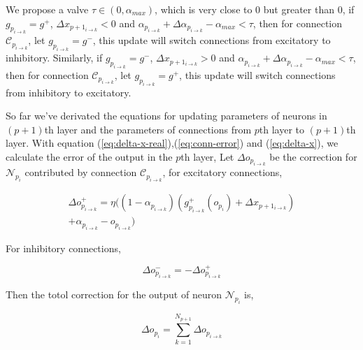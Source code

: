\documentclass[conference]{IEEEtran}
\begin{document}
We propose a valve $\tau\in(0,\alpha_{max})$, which is very close to 0 but greater
than 0, if $g_{p_{i\rightarrow{k}}}=g^{+}$, $\Delta x_{p+1_{i\rightarrow{k}}}<0$
and $\alpha_{p_{i\rightarrow{k}}}+\Delta\alpha_{p_{i\rightarrow{k}}}-\alpha_{max}<\tau$,
then for connection $\mathcal{C}_{p_{i\rightarrow{k}}}$, let $g_{p_{i\rightarrow{k}}}=g^{-}$, this update will
switch connections from excitatory to inhibitory.
Similarly, if $g_{p_{i\rightarrow{k}}}=g^{-}$, $\Delta x_{p+1_{i\rightarrow{k}}}>0$
and $\alpha_{p_{i\rightarrow{k}}}+\Delta\alpha_{p_{i\rightarrow{k}}}-\alpha_{max}<\tau$,
then for connection $\mathcal{C}_{p_{i\rightarrow{k}}}$, let $g_{p_{i\rightarrow{k}}}=g^{+}$, this update will
switch connections from inhibitory to excitatory.




So far we've derivated the equations for updating parameters of neurons
in $(p+1)$th layer and the parameters of connections from $p$th layer to
$(p+1)$th layer. With equation (\ref{eq:delta-x-real}),(\ref{eq:conn-error})
and (\ref{eq:delta-x}), we calculate the error of the output in the $p$th layer,
Let $\Delta o_{p_{i\rightarrow{k}}}$ be the correction for $\mathcal{N}_{p_i}$
contributed by connection $\mathcal{C}_{p_{i\rightarrow{k}}}$,
for excitatory connections,

\begin{multline}
    \Delta o^{+}_{p_{i\rightarrow{k}}} =
        \eta((1-\alpha_{p_{i\rightarrow{k}}})
        (g^{+}_{p_{i\rightarrow{k}}}(o_{p_i})+\Delta x_{p+1_{i\rightarrow{k}}})\\
        +\alpha_{p_{i\rightarrow{k}}}-o_{p_{i\rightarrow{k}}})
    \label{eq:backprop-conn-pos}
\end{multline}

For inhibitory connections,

\begin{equation}
    \Delta o^{-}_{p_{i\rightarrow{k}}} = -\Delta o^{+}_{p_{i\rightarrow{k}}}
    \label{eq:backprop-conn-neg}
\end{equation}

Then the totol correction for the output of neuron $\mathcal{N}_{p_i}$ is,

\begin{equation}
    \Delta o_{p_i} = \sum_{k=1}^{N_{p+1}}\Delta o_{p_{i\rightarrow{k}}}
    \label{eq:backprop-neuron}
\end{equation}
\end{document}
